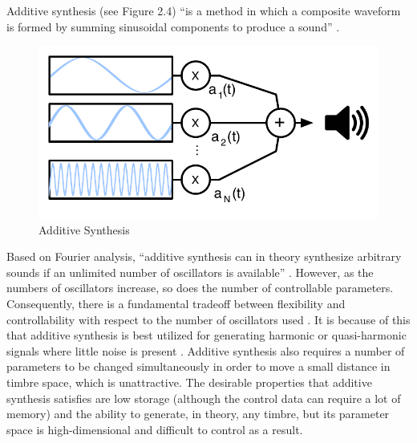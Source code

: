\documentclass[12pt]{report} 	%
\numberwithin{figure}{chapter}
\numberwithin{table}{chapter}
\numberwithin{equation}{chapter}
\begin{document}
\begin{flushleft}
Additive synthesis (see Figure 2.4) ``is a method in which a composite waveform is formed by summing sinusoidal components to produce a sound'' \cite[p. 17]{Tolonen:1998bh}. 
\begin{figure}[h!]
\begin{center}
\includegraphics[scale=0.8]{AdditiveSynthesis}
\caption[Additive synthesis]{Additive Synthesis}
\end{center}
\end{figure}
Based on Fourier analysis, ``additive synthesis can in theory synthesize arbitrary sounds if an unlimited number of oscillators is available'' \cite[p. 94]{Tolonen:1998bh}. However, as the numbers of oscillators increase, so does the number of controllable parameters. Consequently, there is a fundamental tradeoff between flexibility and controllability with respect to the number of oscillators used \cite[p. 7]{Klingbeil:2009lo}. It is because of this that additive synthesis is best utilized for generating harmonic or quasi-harmonic signals where little noise is present \cite[p. 5]{Vercoe:1998hh}. Additive synthesis also requires a number of parameters to be changed simultaneously in order to move a small distance in timbre space, which is unattractive. The desirable properties that additive synthesis satisfies are low storage (although the control data can require a lot of memory) and the ability to generate, in theory, any timbre, but its parameter space is high-dimensional and difficult to control as a result.


\end{flushleft}
\end{document}
